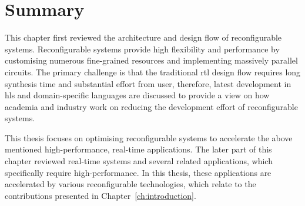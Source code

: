 

\section{Summary}
\label{sec:bg_summary}

This chapter first reviewed the architecture and design flow of reconfigurable systems.
Reconfigurable systems provide high flexibility and performance by customising numerous fine-grained resources and implementing massively parallel circuits.
The primary challenge is that the traditional \gls{rtl} design flow requires long synthesis time and substantial effort from user, therefore, latest development in \gls{hls} and domain-specific languages are discussed to provide a view on how academia and industry work on reducing the development effort of reconfigurable systems.

This thesis focuses on optimising reconfigurable systems to accelerate the above mentioned high-performance, real-time applications.
The later part of this chapter reviewed real-time systems and several related applications, which specifically require high-performance.
In this thesis, these applications are accelerated by various reconfigurable technologies, which relate to the contributions presented in Chapter~\ref{ch:introduction}.
